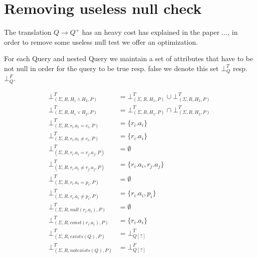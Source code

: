 \section{Removing useless null check}
The translation $Q \rightarrow Q^+$ has an heavy cost has explained in the paper ..., in order to remove some useless null test we offer an optimization.

\begin{mydef}
	For each Query and nested Query we maintain a set of attributes that have to be not null in order for the query to be true resp. false we denote this set $\bot^T_{Q}$ resp.$\bot^F_{Q}$.
\end{mydef} 

\begin{mydef}
	\begin{align*}
		\bot^T_{(\Sigma,R,H_1 \land H_2,P)} & = \bot^T_{(\Sigma,R,H_1,P)} \cup \bot^T_{(\Sigma,R,H_2,P)} \\
		\bot^T_{(\Sigma,R,H_1 \lor H_2,P)} & = \bot^T_{(\Sigma,R,H_1,P)} \cap \bot^T_{(\Sigma,R,H_2,P)} \\
		\bot^T_{(\Sigma,R,r_i.a_i = c_i,P)} & = \{r_i.a_i\} \\
		\bot^T_{(\Sigma,R,r_i.a_i \neq c_i,P)} & = \{r_i.a_i\} \\
		\bot^T_{(\Sigma,R,r_i.a_i = r_j.a_j,P)} & = \emptyset \\
		\bot^T_{(\Sigma,R,r_i.a_i \neq r_j.a_j,P)} & = \{r_i.a_i,r_j.a_j\} \\
		\bot^T_{(\Sigma,R,r_i.a_i = p_i,P)} & = \emptyset \\
		\bot^T_{(\Sigma,R,r_i.a_i \neq p_i,P)} & = \{r_i.a_i,p_i\} \\
		\bot^T_{(\Sigma,R,null(r_i.a_i),P)} & = \emptyset \\
		\bot^T_{(\Sigma,R,const(r_i.a_i),P)} & = \{r_i.a_i\} \\
		\bot^T_{(\Sigma,R,exists(Q),P)} & = \bot^T_{Q[?]} \\
		\bot^T_{(\Sigma,R,notexists(Q),P)} & = \bot^F_{Q[?]}\\
	\end{align*}
	

\end{mydef}
